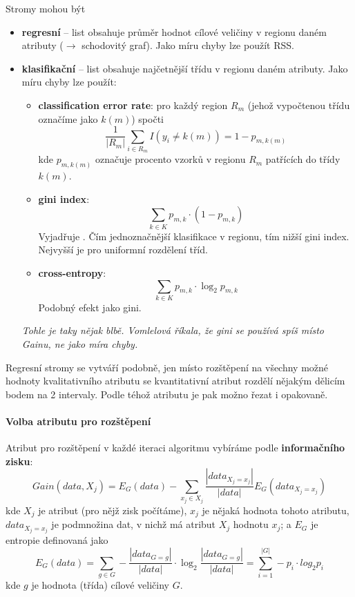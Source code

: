 \documentclass[11pt]{report} %
\numberwithin{equation}{section}
\begin{document}
Stromy mohou být
\begin{itemize}
	\item \textbf{regresní} -- list obsahuje průměr hodnot cílové veličiny v regionu daném atributy ($\to$ schodovitý graf). Jako míru chyby lze použít RSS.
	
	\item \textbf{klasifikační} -- list obsahuje najčetnější třídu v regionu daném atributy. Jako míru chyby lze použít:
	\begin{itemize}
		\item \textbf{classification error rate}: pro každý region $R_m$ (jehož vypočtenou třídu označíme jako $k(m)$) spočti
		$$\frac{1}{|R_m|} \sum_{i \in R_m} I(y_i \neq k(m)) = 1 - p_{m,k(m)}$$
		kde $p_{m,k(m)}$ označuje procento vzorků v regionu $R_m$ patřících do třídy $k(m)$.
		
		\item \textbf{gini index}: 
		$$\sum_{k \in K} p_{m,k} \cdot (1 - p_{m,k})$$
		Vyjadřuje . Čím jednoznačnější klasifikace v regionu, tím nižší gini index. Nejvyšší je pro uniformní rozdělení tříd.
		
		\item \textbf{cross-entropy}: 
		$$\sum_{k \in K} p_{m,k}\cdot \log_2 p_{m,k}$$
		Podobný efekt jako gini.
	\end{itemize}

	\textit{Tohle je taky nějak blbě. Vomlelová říkala, že gini se používá spíš místo Gainu, ne jako míra chyby.}
\end{itemize}

Regresní stromy se vytváří podobně, jen místo rozštěpení na všechny možné hodnoty kvalitativního atributu se kvantitativní atribut rozdělí nějakým dělicím bodem na 2 intervaly. Podle téhož atributu je pak možno řezat i opakovaně. 

\paragraph{Volba atributu pro rozštěpení}
Atribut pro rozštěpení v každé iteraci algoritmu vybíráme podle \textbf{informačního zisku}:
$$Gain(data, X_j) = E_G(data) - \sum_{x_j \in X_j} \frac{|data_{X_j = x_j}|}{|data|}E_G(data_{X_j = x_j}) $$
kde $X_j$ je atribut (pro nějž zisk počítáme), $x_j$ je nějaká hodnota tohoto atributu, $data_{X_j = x_j}$ je podmnožina dat, v nichž má atribut $X_j$ hodnotu $x_j$; a $E_G$ je entropie definovaná jako
$$E_G(data) = \sum_{g \in G} - \frac{|data_{G=g}|}{|data|}\cdot \log_2 \frac{|data_{G=g}|}{|data|} = \sum_{i=1}^{|G|} - p_i\cdot log_2p_i$$
kde $g$ je hodnota (třída) cílové veličiny $G$.
\end{document}
